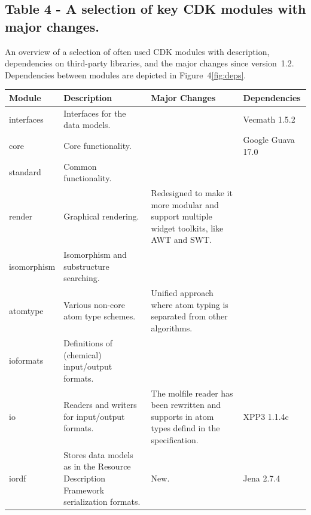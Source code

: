 \documentclass[10pt]{bmcart}
\begin{document}
\begin{backmatter}
\begin{minipage}{1\textwidth}
\begin{tabular}{lcclc}
    \end{tabular}
    \end{minipage}

      \subsection*{Table 4 - A selection of key CDK modules with major changes.}\label{tab:modules}
  An overview of a selection of often used CDK modules with description,
  dependencies on third-party libraries, and the major changes since
  version~1.2. Dependencies between modules are depicted in Figure~4\ref{fig:deps}.
  \baselineskip

    \begin{minipage}{1\textwidth}
    \renewcommand*{\thempfootnote}{\fnsymbol{mpfootnote}}
    \centering
    \begin{tabular}{lp{3cm}p{3cm}l}
  \textbf{Module}            & \textbf{Description}  & \textbf{Major Changes} & \textbf{Dependencies} \\ \hline
  interfaces                 & Interfaces for the data models. & & Vecmath 1.5.2 \\ \hline
  core                       & Core functionality.             & & Google Guava 17.0 \\ \hline %
  standard                   & Common functionality.           & & \\ \hline
  render                     & Graphical rendering.            & Redesigned to make it more modular and support multiple widget toolkits, like AWT and SWT. & \\ \hline
  isomorphism                & Isomorphism and substructure searching. & & \\ \hline
  atomtype                   & Various non-core atom type schemes.     & Unified approach where atom typing is separated from other algorithms. & \\ \hline
  ioformats                  & Definitions of (chemical) input/output formats. & & \\ \hline
  io                         & Readers and writers for input/output formats.  & The molfile reader has been rewritten and supports in atom types defind in the specification. & XPP3 1.1.4c \\ \hline
  iordf                      & Stores data models as in the Resource Description Framework serialization formats. & New. & Jena 2.7.4 \\ \hline

\end{tabular}
\end{minipage}
\end{backmatter}
\end{document}
